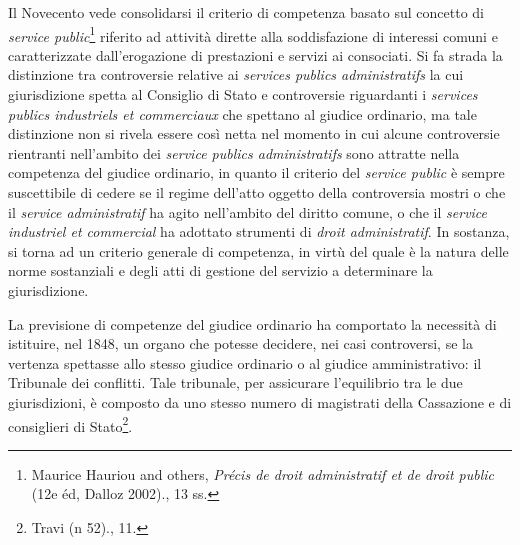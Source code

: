 \documentclass[12pt,it,a4paper,]{report}
\begin{document}
Il Novecento vede consolidarsi il criterio di competenza basato sul
concetto di \emph{service public}\footnote{{Maurice Hauriou and others,
  \emph{Précis de droit administratif et de droit public} (12e éd,
  Dalloz 2002).}, 13 ss.} riferito ad attività dirette alla
soddisfazione di interessi comuni e caratterizzate dall'erogazione di
prestazioni e servizi ai consociati. Si fa strada la distinzione tra
controversie relative ai \emph{services publics administratifs} la cui
giurisdizione spetta al Consiglio di Stato e controversie riguardanti i
\emph{services publics industriels et commerciaux} che spettano al
giudice ordinario, ma tale distinzione non si rivela essere così netta
nel momento in cui alcune controversie rientranti nell'ambito dei
\emph{service publics administratifs} sono attratte nella competenza del
giudice ordinario, in quanto il criterio del \emph{service public} è
sempre suscettibile di cedere se il regime dell'atto oggetto della
controversia mostri o che il \emph{service administratif} ha agito
nell'ambito del diritto comune, o che il \emph{service industriel et
commercial} ha adottato strumenti di \emph{droit administratif}. In
sostanza, si torna ad un criterio generale di competenza, in virtù del
quale è la natura delle norme sostanziali e degli atti di gestione del
servizio a determinare la giurisdizione.

La previsione di competenze del giudice ordinario ha comportato la
necessità di istituire, nel 1848, un organo che potesse decidere, nei
casi controversi, se la vertenza spettasse allo stesso giudice ordinario
o al giudice amministrativo: il Tribunale dei conflitti. Tale tribunale,
per assicurare l'equilibrio tra le due giurisdizioni, è composto da uno
stesso numero di magistrati della Cassazione e di consiglieri di
Stato\footnote{{Travi (n 52).}, 11.}.
\end{document}
